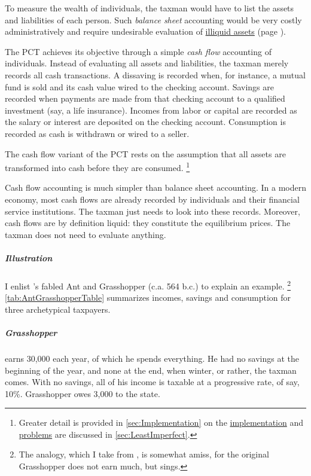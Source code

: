 To measure the wealth of individuals, the taxman would have to list the assets and liabilities of each person.
Such \emph{balance sheet} accounting would be very costly administratively and require undesirable evaluation of \hyperref[des:NoIlliquidAssets]{illiquid assets} (page \pageref{des:NoIlliquidAssets}).

The PCT achieves its objective through a simple \emph{cash flow} accounting of individuals.
Instead of evaluating all assets and liabilities, the taxman merely records all cash transactions.
A dissaving is recorded when, for instance, a mutual fund is sold and its cash value wired to the checking account.
Savings are recorded when payments are made from that checking account to a qualified investment (say, a life insurance).
Incomes from labor or capital are recorded as the salary or interest are deposited on the checking account.
Consumption is recorded as cash is withdrawn or wired to a seller.

The cash flow variant of the PCT rests on the assumption that all assets are transformed into cash before they are consumed.
\footnote{
	Greater detail is provided in \autoref{sec:Implementation} on the \hyperref[sec:Implementation]{implementation} and \hyperref[sec:LeastImperfect]{problems} are discussed in \autoref{sec:LeastImperfect}.
}

Cash flow accounting is much simpler than balance sheet accounting.
In a modern economy, most cash flows are already recorded by individuals and their financial service institutions.
The taxman just needs to look into these records.
Moreover, cash flows are by definition liquid:
they constitute the equilibrium prices.
The taxman does not need to evaluate anything.

\subparagraph{Illustration}
I enlist \citeauthor{Aesop}'s fabled Ant and Grasshopper (c.a.
564 b.c.) to explain an example.
\footnote{
	The analogy, which I take from \cite{McCaffery2005}, is somewhat amiss, for the original Grasshopper does not earn much, but sings.
}
\autoref{tab:AntGrasshopperTable} summarizes incomes, savings and consumption for three archetypical taxpayers.



\subparagraph{Grasshopper}
earns 30,000 each year, of which he spends everything.
He had no savings at the beginning of the year, and none at the end, when winter, or rather, the taxman comes.
With no savings, all of his income is taxable at a progressive rate, of say, 10\%.
Grasshopper owes 3,000 to the state.

